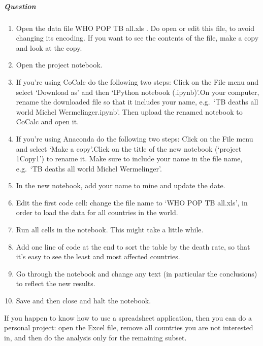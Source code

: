 \documentclass[letterpaper,10pt,english]{sphinxmanual}
\begin{document}
\subparagraph{Question}
\label{\detokenize{content/session_02/Part_02_02:Question}}\begin{enumerate}
%
\item {} 
Open the data file WHO POP TB all.xls . Do  open or edit this file, to avoid changing its encoding. If you want to see the contents of the file, make a copy and look at the copy.

\item {} 
Open the project notebook.

\item {} 
If you’re using CoCalc do the following two steps: Click on the File menu and select ‘Download as’ and then ‘IPython notebook (.ipynb)’.On your computer, rename the downloaded file so that it includes your name, e.g. ‘TB deaths all world \textendash{} Michel Wermelinger.ipynb’. Then upload the renamed notebook to CoCalc and open it.

\item {} 
If you’re using Anaconda do the following two steps: Click on the File menu and select ‘Make a copy’.Click on the title of the new notebook (‘project 1\sphinxhyphen{}Copy1’) to rename it. Make sure to include your name in the file name, e.g. ‘TB deaths all world \textendash{} Michel Wermelinger’.

\item {} 
In the new notebook, add your name to mine and update the date.

\item {} 
Edit the first code cell: change the file name to ‘WHO POP TB all.xls’, in order to load the data for all countries in the world.

\item {} 
Run all cells in the notebook. This might take a little while.

\item {} 
Add one line of code at the end to sort the table by the death rate, so that it’s easy to see the least and most affected countries.

\item {} 
Go through the notebook and change any text (in particular the conclusions) to reflect the new results.

\item {} 
Save and then close and halt the notebook.

\end{enumerate}

If you happen to know how to use a spreadsheet application, then you can do a personal project: open the Excel file, remove all countries you are not interested in, and then do the analysis only for the remaining subset.
\end{document}
